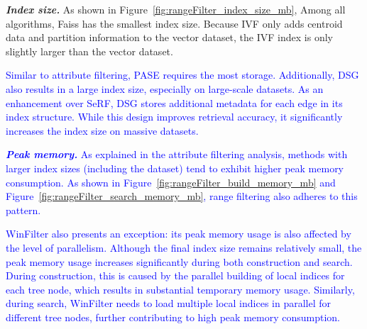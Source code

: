 \documentclass[sigconf, nonacm]{acmart}
\begin{document}
{	
	
	\textit{\textbf{Index size.}} 
	As shown in Figure~\ref{fig:rangeFilter_index_size_mb}, Among all algorithms, Faiss has the smallest index size. Because IVF only adds centroid data and partition information to the vector dataset, the IVF index is only slightly larger than the vector dataset.

	
	\textcolor{blue}{Similar to attribute filtering, PASE requires the most storage. }
	\textcolor{blue}{Additionally, DSG also results in a large index size, especially on large-scale datasets. As an enhancement over SeRF, DSG stores additional metadata for each edge in its index structure. While this design improves retrieval accuracy, it significantly increases the index size on massive datasets.}
	
	
	\textcolor{blue}{\textit{\textbf{Peak memory.}}  
	As explained in the attribute filtering analysis, methods with larger index sizes (including the dataset) tend to exhibit higher peak memory consumption. As shown in Figure~\ref{fig:rangeFilter_build_memory_mb} and Figure~\ref{fig:rangeFilter_search_memory_mb}, range filtering also adheres to this pattern.}  

	\textcolor{blue}{WinFilter also presents an exception:  its peak memory usage is also affected by the level of parallelism. Although the final index size remains relatively small, the peak memory usage increases significantly during both construction and search. During construction, this is caused by the parallel building of local indices for each tree node, which results in substantial temporary memory usage. Similarly, during search, WinFilter needs to load multiple local indices in parallel for different tree nodes, further contributing to high peak memory consumption.}
	

}
\end{document}
